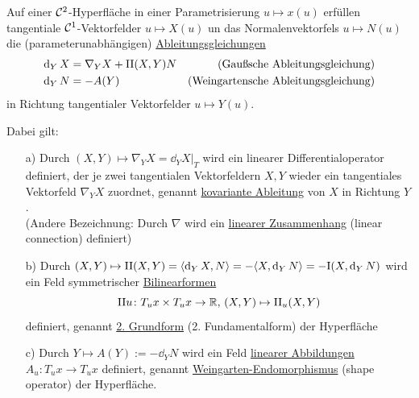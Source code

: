 \begin{satz}\label{satz214}
 Auf einer \(\mathcal{C}^2\)-Hyperfläche in einer Parametrisierung \(u \mapsto x(u) \) erfüllen tangentiale \(\mathcal{C}^1\)-Vektorfelder \(u \mapsto X(u)\) un das Normalenvektorfels \(u \mapsto N(u)\) die (parameterunabhängigen) \uline{Ableitungsgleichun}\-\uline{gen}
\begin{align*}
 \dd_Y X &= \nabla_Y X + \Rom 2 (X,Y) N & \text{(Gaußsche Ableitungsgleichung)} \\
 \dd_Y N &= -A (Y) & \text{(Weingartensche Ableitungsgleichung)}
\end{align*}
in Richtung tangentialer Vektorfelder \(u \mapsto Y(u)\). \par
Dabei gilt:
\begin{enumerate}
 \item[a)] Durch \((X,Y) \mapsto \nabla_Y X = \dd_Y X |_T\) wird ein linearer Differentialoperator definiert, der je zwei tangentialen Vektorfeldern \(X,Y\) wieder ein tangentiales Vektorfeld \(\nabla_Y X\) zuordnet, genannt \uline{kovariante Ableitung} von \(X\) in Richtung \(Y\). \\
 (Andere Bezeichnung: Durch \(\nabla\) wird ein \uline{linearer Zusammenhang} (linear connection) definiert)
 \item[b)] Durch \((X,Y) \mapsto \Rom 2(X,Y) = \langle \dd_Y X, N\rangle = -\langle X, \dd_Y N \rangle = -\Rom 1 (X, \dd_YN)\) wird ein Feld symmetrischer \uline{Bilinearformen} 
 \[
  \Rom 2 u \colon T_u x \times T_u x \to \IR, \, (X,Y) \mapsto \Rom 2_u (X,Y)
 \]
 definiert, genannt \uline{2. Grundform} (2. Fundamentalform) der Hyperfläche
 \item[c)] Durch \(Y \mapsto A(Y) := -\dd_Y N\) wird ein Feld \uline{linearer Abbildungen} \(A_u \colon T_u x \to T_u x\) definiert, genannt \uline{Weingarten-Endomorphismus} (shape operator) der Hyperfläche.
\end{enumerate}

\end{satz}

